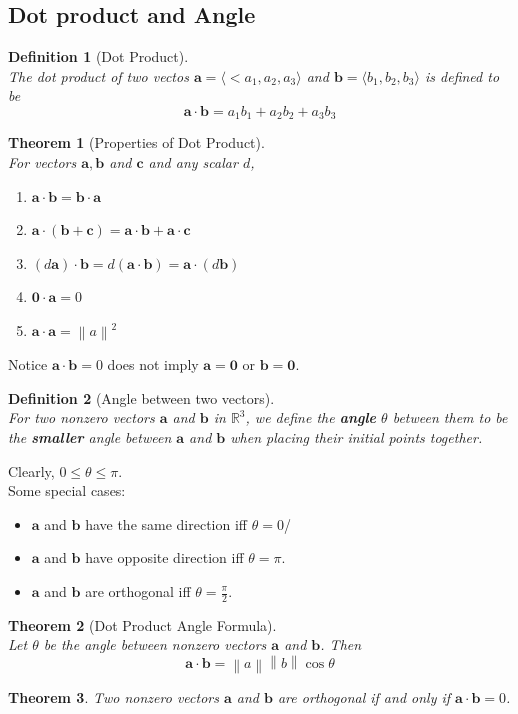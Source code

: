 \documentclass[12pt]{article}
\newcommand\norm[1]{\left\lVert#1\right\rVert}
\newtheorem{definition}{Definition}[section]
\newtheorem{theorem}{Theorem}[section]
\theoremstyle{definition}
\newcommand\ve[1]{\mathbf{#1}}
\begin{document}
\subsection{Dot product and Angle}
\begin{definition}[Dot Product]
\hfill\\\normalfont The dot product of two vectos $\ve{a}=\langle<a_1,a_2,a_3\rangle$ and $\ve{b}=\langle b_1,b_2,b_3\rangle$ is defined to be
\[
\ve{a}\cdot\ve{b}=a_1b_1+a_2b_2+a_3b_3
\]
\end{definition}
\begin{theorem}[Properties of Dot Product]
\hfill\\\normalfont For vectors $\ve{a}, \ve{b}$ and $\ve{c}$ and any scalar $d$,
\begin{enumerate}
  \item $\ve{a}\cdot\ve{b} = \ve{b}\cdot\ve{a}$
  \item $\ve{a}\cdot(\ve{b}+\ve{c})=\ve{a}\cdot\ve{b}+\ve{a}\cdot\ve{c}$
  \item $(d\ve{a})\cdot \ve{b} = d(\ve{a}\cdot\ve{b}) = \ve{a}\cdot(d\ve{b})$
  \item $\ve{0}\cdot\ve{a}=0$
  \item $\ve{a}\cdot\ve{a}=\norm{a}^2$
\end{enumerate}
\end{theorem}
Notice $\ve{a}\cdot\ve{b}= 0$ does not imply $\ve{a}=\ve{0}$ or $\ve{b}=\ve{0}$.
\begin{definition}[Angle between two vectors]
\hfill\\\normalfont For two nonzero vectors $\ve{a}$ and $\ve{b}$ in $\mathbb{R}^3$, we define the \textbf{angle} $\theta$ between them to be the \textbf{smaller} angle between $\ve{a}$ and $\ve{b}$ when placing their initial points together.
\end{definition}
Clearly, $0\leq \theta\leq \pi$.\\
Some special cases:
\begin{itemize}
\item $\ve{a}$ and $\ve{b}$ have the same direction iff $\theta = 0$/
\item $\ve{a}$ and $\ve{b}$ have opposite direction iff $\theta = \pi$.
\item $\ve{a}$ and $\ve{b}$ are orthogonal iff $\theta = \frac{\pi}{2}$.
\end{itemize}
\begin{theorem}[Dot Product Angle Formula]
\hfill\\\normalfont Let $\theta$ be the angle between nonzero vectors $\ve{a}$ and $\ve{b}$. Then
\[
\ve{a}\cdot\ve{b}=\norm{a}\norm{b}\cos\theta
\]
\end{theorem}
\begin{theorem}\normalfont Two nonzero vectors $\ve{a}$ and $\ve{b}$ are orthogonal if and only if $\ve{a}\cdot\ve{b} = 0$.
\end{theorem}
\end{document}
